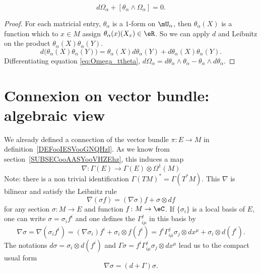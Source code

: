 \begin{lemma}
  \[
     d\Omega_{\alpha}+[\theta_{\alpha}\wedge\Omega_{\alpha}]=0.
  \]
\end{lemma}

\begin{proof}
For each matricial entry, $\theta_{\alpha}$ is a $1$-form on $\mU_{\alpha}$, then $\theta_{\alpha}(X)$ is a function which to $x\in M$ assign $\theta_{\alpha}(x)(X_x)\in\eR$. So we can apply $d$ and Leibnitz on the product $\theta_{\alpha}(X)\theta_{\alpha}(Y)$.
\[
 d\big(  \theta_{\alpha}(X)\theta_{\alpha}(Y)  \big)=\theta_{\alpha}(X)d\theta_{\alpha}(Y)+d\theta_{\alpha}(X)\theta_{\alpha}(Y).
\]
Differentiating equation \eqref{eq:Omega_ttheta}, $d\Omega_{\alpha}=d\theta_{\alpha}\wedge\theta_{\alpha}-\theta_{\alpha}\wedge d\theta_{\alpha}$.
\end{proof}

\section{Connexion on vector bundle: algebraic view}

We already defined a connection of the vector bundle \( \pi\colon E\to M\) in definition~\ref{DEFooIESVooGNQHzl}. As we know from section~\ref{SUBSECooAASYooVHZEhz}, this induces a map
\begin{equation}        \label{EQooBRLHooJgzIyT}
    \nabla\colon \Gamma(E)\to \Gamma(E)\otimes \Omega^1(M)
\end{equation}
Note: there is a non trivial identification \( \Gamma(TM)^*=\Gamma(T^*M)\). This \( \nabla\) is bilinear and satisfy the Leibnitz rule
\begin{equation}
\nabla(\sigma f)=(\nabla\sigma)f+\sigma\otimes df
\end{equation}
for any section $\sigma\colon M\to E$ and function $f\colon M\to \eC$. If $\{ \sigma_i \}$ is a local basis of $E$, one can write $\sigma=\sigma_if^i$ and one defines the  $\Gamma_{i\mu}^{j}$ in this basis by
\begin{equation}
\nabla \sigma=\nabla (\sigma_if^i)
		=(\nabla \sigma_i)f^i+\sigma_i\otimes f(f^i)
		=f^i\Gamma_{i\mu}^{j}\sigma_j\otimes dx^{\mu}+\sigma_i\otimes d(f^i).
\end{equation}
The notations $d\sigma=\sigma_i\otimes d(f^i)$ and $\Gamma\sigma=f^i\Gamma_{i\mu}^{j}\sigma_j\otimes dx^{\mu}$ lead us to the compact usual form
\[
  \nabla\sigma=(d+\Gamma)\sigma.
\]

